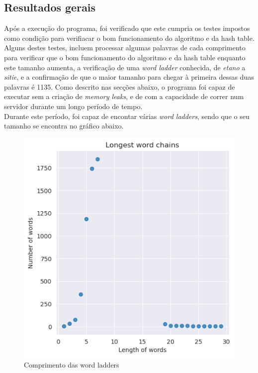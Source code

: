 \documentclass[a4paper,11pt]{article}
\begin{document}
	\subsection{Resultados gerais}
	Após a execução do programa, foi verificado que este cumpria os testes impostos como condição para verifiacar o bom funcionamento do algoritmo e da hash table.\\
	Alguns destes testes, incluem processar algumas palavras de cada comprimento para verificar que o bom funcionamento do algoritmo e da hash table enquanto este tamanho aumenta, a verificação de uma \emph{word ladder} conhecida, de \emph{etano} a \emph{sitie}, e a confirmação de que o maior tamanho para chegar à primeira dessas duas palavras é 1135.
	Como descrito nas secções abaixo, o programa foi capaz de executar sem a criação de \emph{memory leaks}, e de com a capacidade de correr num servidor durante um longo período de tempo.\\
	Durante este período, foi capaz de encontar várias \emph{word ladders}, sendo que o seu tamanho se encontra no gráfico abaixo.\\
	\begin{figure}[h]
        \centering
        \includegraphics[width=\textwidth]{output_4_1}
        \caption{Comprimento das word ladders}\label{fig:graph-1}
    \end{figure}\\
\end{document}
